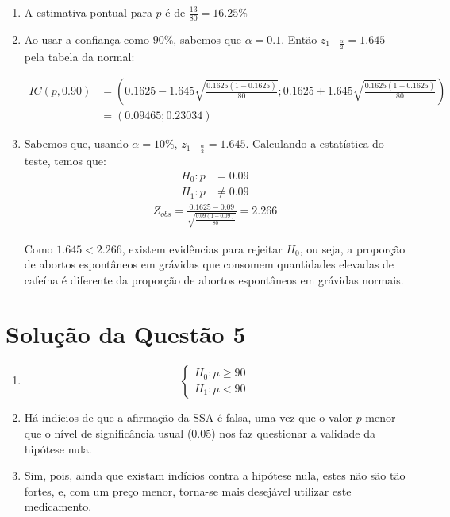 \documentclass[
	12pt,				%
	openright,			%
	oneside,			%
	a4paper,			%
	english,			%
	brazil,				%
	]{abntex2}
\begin{document}
\begin{enumerate}[label=\alph*)]
    \item A estimativa pontual para $p$ é de $\frac{13}{80} = 16.25\%$
    \item 
    
    Ao usar a confiança como $90\%$, sabemos que $\alpha = 0.1$. Então $z_{1 - \frac{\alpha}{2}} = 1.645$ pela tabela da normal:
    
    \begin{align*}
        IC(p, 0.90) &= \left(0.1625 - 1.645\sqrt{\frac{0.1625(1 - 0.1625)}{80}}; 0.1625 + 1.645\sqrt{\frac{0.1625(1 - 0.1625)}{80}}\right)\\
        &= \left(0.09465;0.23034\right)
    \end{align*}
    \item Sabemos que, usando $\alpha = 10\%$, $z_{1 - \frac{\alpha}{2}} = 1.645$. Calculando a estatística do teste, temos que:
    \begin{align*}
        H_{0}: p &= 0.09\\
        H_{1}: p &\neq 0.09
    \end{align*}
    \begin{align*}
        Z_{obs} = \frac{0.1625 - 0.09}{\sqrt{\frac{0.09(1 - 0.09)}{80}}} = 2.266
    \end{align*}
    
    Como $1.645 < 2.266$, existem evidências para rejeitar $H_{0}$, ou seja, a proporção de abortos espontâneos em grávidas que consomem quantidades elevadas de cafeína é diferente da proporção de abortos espontâneos em grávidas normais.
    
\end{enumerate}


\section{Solução da Questão 5}

\begin{enumerate}[label=\alph*)]
    \item
    \[
        \begin{cases}
            H_0: \mu \geq 90\\
            H_1: \mu < 90
        \end{cases}
    \]
    \item Há indícios de que a afirmação da SSA é falsa, uma vez que o valor $p$ menor que o nível de significância usual (0.05) nos faz questionar a validade da hipótese nula.
    \item Sim, pois, ainda que existam indícios contra a hipótese nula, estes não são tão fortes, e, com um preço menor, torna-se mais desejável utilizar este medicamento.
\end{enumerate}
\end{document}
